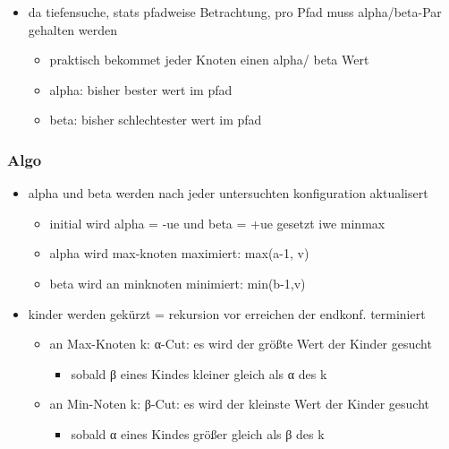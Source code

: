 \documentclass[]{article}
\begin{document}
\begin{itemize}
\item
  da tiefensuche, stats pfadweise Betrachtung, pro Pfad muss
  alpha/beta-Par gehalten werden

  \begin{itemize}
  \item
    praktisch bekommet jeder Knoten einen alpha/ beta Wert
  \item
    alpha: bisher bester wert im pfad
  \item
    beta: bisher schlechtester wert im pfad
  \end{itemize}
\end{itemize}

\hypertarget{header-n1257}{%
\subsubsection{Algo}\label{header-n1257}}

\begin{itemize}
\item
  alpha und beta werden nach jeder untersuchten konfiguration
  aktualisert

  \begin{itemize}
  \item
    initial wird alpha = -ue und beta = +ue gesetzt iwe minmax
  \item
    alpha wird max-knoten maximiert: max(a-1, v)
  \item
    beta wird an minknoten minimiert: min(b-1,v)
  \end{itemize}
\item
  kinder werden gekürzt = rekursion vor erreichen der endkonf.
  terminiert

  \begin{itemize}
  \item
    an Max-Knoten k: α-Cut: es wird der größte Wert der Kinder gesucht

    \begin{itemize}
    \item
      sobald β eines Kindes kleiner gleich als α des k
    \end{itemize}
  \item
    an Min-Noten k: β-Cut: es wird der kleinste Wert der Kinder gesucht

    \begin{itemize}
    \item
      sobald α eines Kindes größer gleich als β des k
    \end{itemize}
  \end{itemize}
\end{itemize}
\end{document}
